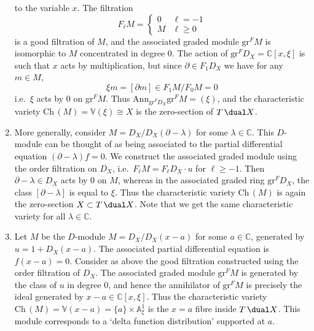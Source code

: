 \begin{example}
\begin{enumerate}[label=(\roman*)]
            to the variable $x$. The filtration 
            \begin{equation*} 
                F_\ell M = \begin{cases} 
                    0 & \ell= -1 \\ 
                    M & \ell \geq 0 
                \end{cases} 
            \end{equation*} 
            is a good filtration of $M$, and the associated graded module
            $\text{gr}^FM$ is isomorphic to $M$ concentrated in degree 0. The
            action of \(\text{gr}^FD_X = \mathbb{C}[x,\xi]\) is such that $x$
            acts by multiplication, but since $\partial\in F_1 D_X$ we have for
            any $m\in M$, \[\xi m = [\partial m] \in F_1 M/ F_0 M = 0 \] i.e.\
            $\xi$ acts by 0 on gr$^F M$. Thus $\text{Ann}_{\text{gr}^F D_X}
            \text{gr}^F M=(\xi)$, and the characteristic variety
            $\text{Ch}\,(M)=\mathbb{V}(\xi)\cong X$ is the zero-section of
            $T\,\dual X$.  
        \item More generally, consider $M= D_X/ D_X(\partial-\lambda)$ for some
            $\lambda\in \mathbb{C}$. This $D$-module can be thought of as being
            associated to the partial differential equation $(\partial-\lambda)f
            = 0$. We construct the associated graded module using the order
            filtration on $D_X$, i.e.\ $F_\ell M = F_\ell D_X\cdot u $ for
            $\ell\geq -1$. Then $\partial-\lambda \in D_X$ acts by 0 on $M$,
            whereas in the associated graded ring $\text{gr}^F D_X$, the class
            $[\partial - \lambda]$ is equal to $\xi$. Thus the characteristic
            variety \(\text{Ch}\,(M)\) is again the zero-section \(X\subset
            T\,\dual X\). Note that we get the same characteristic variety for
            all $\lambda \in \mathbb{C}$.  
        \item  Let $M$ be the $D$-module $M=D_X/D_X(x-a)$ for some $a\in
            \mathbb{C}$, generated by $u= 1 + D_X(x-a)$. The associated partial
            differential equation is $f(x-a)=0$. Consider as above the good
            filtration constructed using the order filtration of $D_X$. The
            associated graded module $\text{gr}^F M$ is generated by the class
            of $u$ in degree 0, and hence the annihilator of $\text{gr}^FM$ is
            precisely the ideal generated by $x-a \in \mathbb{C}[x,\xi]$. Thus
            the characteristic variety
            $\text{Ch}\,(M)=\mathbb{V}(x-a)=\{a\}\times \mathbb{A}^1_\xi$ is the
            $x=a$ fibre inside $T\,\dual X$. This module corresponds to a `delta
            function distribution' supported at $a$.  
    \end{enumerate} 
\end{example}

